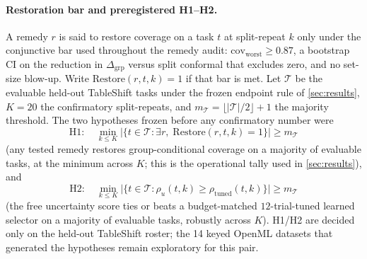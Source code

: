 \documentclass[pdflatex,sn-mathphys-num]{sn-jnl}
\begin{document}
\paragraph{Restoration bar and preregistered H1--H2.}
A remedy $r$ is said to restore coverage on a task $t$ at split-repeat $k$ only under the conjunctive bar used throughout the remedy audit: $\mathrm{cov}_{\mathrm{worst}}\ge 0.87$, a bootstrap CI on the reduction in $\Delta_{\mathrm{grp}}$ versus split conformal that excludes zero, and no set-size blow-up. Write $\mathrm{Restore}(r,t,k)=1$ if that bar is met. Let $\mathcal T$ be the evaluable held-out TableShift tasks under the frozen endpoint rule of \cref{sec:results}, $K{=}20$ the confirmatory split-repeats, and $m_{\mathcal T}=\lfloor|\mathcal T|/2\rfloor+1$ the majority threshold. The two hypotheses frozen before any confirmatory number were
\begin{equation}
\label{eq:h1}
\mathrm{H1}:\quad
\min_{k\le K}\bigl|\bigl\{t\in\mathcal T:\exists r,\;\mathrm{Restore}(r,t,k)=1\bigr\}\bigr|\ge m_{\mathcal T}
\end{equation}
(any tested remedy restores group-conditional coverage on a majority of evaluable tasks, at the minimum across $K$; this is the operational tally used in \cref{sec:results}), and
\begin{equation}
\label{eq:h2}
\mathrm{H2}:\quad
\min_{k\le K}\bigl|\bigl\{t\in\mathcal T:\rho_{u}(t,k)\ge\rho_{\mathrm{tuned}}(t,k)\bigr\}\bigr|\ge m_{\mathcal T}
\end{equation}
(the free uncertainty score ties or beats a budget-matched $12$-trial-tuned learned selector on a majority of evaluable tasks, robustly across $K$). H1/H2 are decided only on the held-out TableShift roster; the 14 keyed OpenML datasets that generated the hypotheses remain exploratory for this pair.
\end{document}
